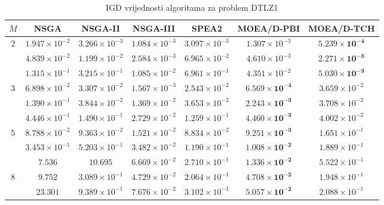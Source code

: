 \documentclass[times, utf8, zavrsni, numeric]{fer}
\begin{document}
\begin{table}[htb]
\caption{IGD vrijednosti algoritama za problem DTLZ1}
\label{tbl:dtlz1}
\centering
\small
\begin{tabular}{c|c|c|c|c|c|c} \hline
$M$ & NSGA & NSGA-II & NSGA-III & SPEA2 & MOEA/D-PBI & MOEA/D-TCH  \\ \hline
\multirow{3}{*}{2}  & $1.947 \times 10^{-2}$    & $3.266\times 10^{-3}$ & $1.084\times 10^{-3}$ & $3.097\times 10^{-3}$ & $1.307\times 10^{-3}$ & $\mathbf{5.239\times 10^{-4}}$\\
			        & $4.839 \times 10^{-2}$    & $1.199\times 10^{-2}$ & $2.584\times 10^{-3}$ & $6.965\times 10^{-2}$ & $4.610\times 10^{-3}$ & $\mathbf{2.271\times 10^{-3}}$\\
                    & $1.315 \times 10^{-1}$    & $3.215\times 10^{-1}$ & $1.085\times 10^{-2}$ & $6.961\times 10^{-1}$ & $4.351\times 10^{-2}$ & $\mathbf{5.030\times 10^{-3}}$\\ \hline
\multirow{3}{*}{3}  & $6.898\times 10^{-2}$     & $3.307\times 10^{-2}$ & $1.567\times 10^{-3}$ & $2.543\times 10^{-2}$ & $\mathbf{6.569\times 10^{-4}}$ & $3.659\times 10^{-2}$\\
			        & $1.390\times 10^{-1}$     & $3.844\times 10^{-2}$ & $1.369\times 10^{-2}$ & $3.653\times 10^{-2}$ & $\mathbf{2.243\times 10^{-3}}$ & $3.708\times 10^{-2}$\\
                    & $4.446\times 10^{-1}$     & $1.490\times 10^{-1}$ & $2.729\times 10^{-2}$ & $1.259\times 10^{-1}$ & $\mathbf{4.460\times 10^{-3}}$ & $4.002\times 10^{-2}$\\ \hline
\multirow{3}{*}{5}  & $8.788\times 10^{-2}$     & $9.363\times 10^{-2}$ & $1.521\times 10^{-2}$ & $8.834\times 10^{-2}$ & $\mathbf{9.251\times 10^{-3}}$ & $1.651\times 10^{-1}$\\
			        & $3.453\times 10^{-1}$     & $5.203\times 10^{-1}$ & $3.482\times 10^{-2}$ & $1.190\times 10^{-1}$ & $\mathbf{1.008\times 10^{-2}}$ & $1.889\times 10^{-1}$\\
                    & $7.536$                   & $10.695$              & $6.669\times 10^{-2}$ & $2.710\times 10^{-1}$ & $\mathbf{1.336\times 10^{-2}}$ & $5.522\times 10^{-1}$\\ \hline
\multirow{3}{*}{8}  & $9.752$                   & $3.089\times 10^{-1}$ & $4.729\times 10^{-2}$ & $2.064\times 10^{-1}$ & $\mathbf{4.708\times 10^{-2}}$ & $1.948\times 10^{-1}$\\
			        & $23.301$                  & $9.389\times 10^{-1}$ & $7.676\times 10^{-2}$ & $3.102\times 10^{-1}$ & $\mathbf{5.057\times 10^{-2}}$ & $2.088\times 10^{-1}$\\

\end{tabular}
\end{table}
\end{document}
